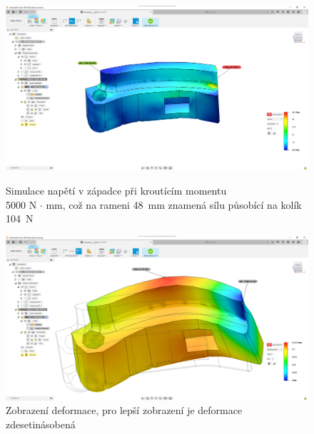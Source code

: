 \begin{figure}[h]
    \centering
    \includegraphics[width=\textwidth]{kapitoly/obrazky/E4/zapadka/simulace/napeti_D1-M5000.png}
    \caption{\centering Simulace napětí v západce při kroutícím momentu \\ 5000 N $\cdot$ mm, což na rameni 48~mm znamená sílu působící na kolík 104~N}

    \vspace{10mm}

    \includegraphics[width=\textwidth]{kapitoly/obrazky/E4/zapadka/simulace/Dislokace_D10-M5000.png}
    \caption{\centering Zobrazení deformace, pro lepší zobrazení je deformace zdesetinásobená}
    \label{fig:E4-simulace_zapadky}
\end{figure}

